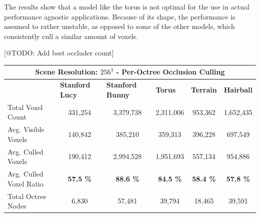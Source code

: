 \noindent
The results show that a model like the torus is not optimal for the use in actual performance agnostic applications.
Because of its shape, the performance is assumed to rather unstable, as opposed to some of the other models, which 
consistently cull a similar amount of voxels.


[@TODO: Add best occluder count]

\begin{table}[h]
  \begin{tabular}{|lccccc|}
  \hline
  \multicolumn{6}{|c|}{\textbf{Scene Resolution: $256^3$ - Per-Octree Occlusion Culling}}                                                                                                                                                                                         \\ \hline
  \multicolumn{1}{|l|}{}                          & \multicolumn{1}{|l|}{\textbf{Stanford Lucy}}  & \multicolumn{1}{l|}{\textbf{Stanford Bunny}}  & \multicolumn{1}{l|}{\textbf{Torus}}   & \multicolumn{1}{l|}{\textbf{Terrain}}     & \multicolumn{1}{l|}{\textbf{Hairball}}    \\ \hline
  \multicolumn{1}{|l|}{Total Voxel Count}         & \multicolumn{1}{c|}{331,254}                  & \multicolumn{1}{c|}{3,379,738}                & \multicolumn{1}{c|}{2,311,006}        & \multicolumn{1}{c|}{953,362}              & \multicolumn{1}{c|}{1,652,435}            \\
  \multicolumn{1}{|l|}{Avg. Visible Voxels}       & \multicolumn{1}{c|}{140,842}                  & \multicolumn{1}{c|}{385,210}                  & \multicolumn{1}{c|}{359,313}          & \multicolumn{1}{c|}{396,228}              & \multicolumn{1}{c|}{697,549}              \\
  \multicolumn{1}{|l|}{Avg. Culled Voxels}        & \multicolumn{1}{c|}{190,412}                  & \multicolumn{1}{c|}{2,994,528}                & \multicolumn{1}{c|}{1,951,693}        & \multicolumn{1}{c|}{557,134}              & \multicolumn{1}{c|}{954,886}              \\
  \multicolumn{1}{|l|}{Avg. Culled Voxel Ratio}   & \multicolumn{1}{c|}{\textbf{57.5 \%}}         & \multicolumn{1}{c|}{\textbf{88.6 \%}}         & \multicolumn{1}{c|}{\textbf{84.5 \%}} & \multicolumn{1}{c|}{\textbf{58.4 \%}}     & \multicolumn{1}{c|}{\textbf{57.8 \%}}     \\ \hline
  \multicolumn{1}{|l|}{Total Octree Nodes}        & \multicolumn{1}{c|}{6,830}                    & \multicolumn{1}{c|}{57,481}                   & \multicolumn{1}{c|}{39,794}           & \multicolumn{1}{c|}{18,465}               & \multicolumn{1}{c|}{39,591}               \\

\end{tabular}
\end{table}
